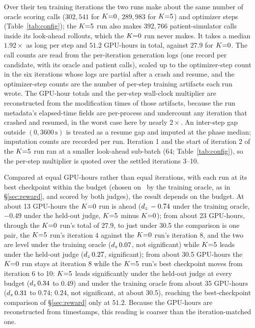 Over their ten training iterations the two runs make about the same number of oracle scoring calls
($302{,}541$ for $K{=}0$, $289{,}983$ for $K{=}5$) and optimizer steps (Table~\ref{tab:config}); the
$K{=}5$ run also makes $392{,}766$ patient-simulator calls inside its look-ahead rollouts, which the
$K{=}0$ run never makes. It takes a median $1.92\times$ as long per step and $51.2$ GPU-hours in
total, against $27.9$ for $K{=}0$. The call counts are read from the per-iteration
generation logs (one record per candidate, with its oracle and patient calls), scaled up to the
optimizer-step count in the six iterations whose logs are partial after a crash and resume, and
the optimizer-step counts
are the number of per-step training artifacts each run wrote. The GPU-hour totals and the
per-step wall-clock multiplier are reconstructed from the modification times of those artifacts, because
the run metadata's elapsed-time fields are per-process and undercount any iteration that crashed
and resumed, in the worst case here by nearly $2\times$. An inter-step gap outside
$(0, 3600\,\mathrm{s})$ is treated as a resume gap and imputed at the phase median; imputation
counts are recorded per run. Iteration 1 and the start of iteration 2 of the $K{=}5$ run ran at a
smaller look-ahead sub-batch (64; Table~\ref{tab:config}), so the per-step multiplier is quoted
over the settled iterations 3--10.

Compared at equal GPU-hours rather than equal iterations, with each run at its best checkpoint
within the budget (chosen on \QQ\ by the training oracle, as in \S\ref{sec:reward}, and scored by
both judges), the result depends on the budget. At about 13 GPU-hours the $K{=}0$ run is ahead
($d_z\,-0.74$ under the training oracle, $-0.49$ under the held-out judge, $K{=}5$ minus $K{=}0$); from
about 23 GPU-hours, through the $K{=}0$ run's total of $27.9$, to just under 30.5 the comparison is one
pair, the $K{=}5$ run's iteration 4 against the $K{=}0$ run's iteration 8, and the two are level under
the training oracle ($d_z\,0.07$, not significant) while $K{=}5$ leads under the held-out judge
($d_z\,0.27$, significant); from about 30.5 GPU-hours the $K{=}0$ run stays at iteration 8 while the
$K{=}5$ run's best checkpoint moves from iteration 6 to 10: $K{=}5$ leads significantly under the held-out judge at every budget ($d_z\,0.34$
to $0.49$) and under the training oracle from about 35 GPU-hours ($d_z\,0.31$ to $0.74$; $0.24$,
not significant, at about 30.5), reaching the best-checkpoint comparison of \S\ref{sec:reward}
only at $51.2$. Because the GPU-hours are reconstructed from
timestamps, this reading is coarser than the iteration-matched one.

